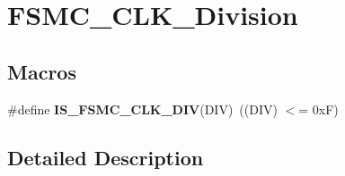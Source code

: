\hypertarget{group___f_s_m_c___c_l_k___division}{\section{F\-S\-M\-C\-\_\-\-C\-L\-K\-\_\-\-Division}
\label{group___f_s_m_c___c_l_k___division}
}
\subsection*{Macros}
\begin{DoxyCompactItemize}
\item 
\hypertarget{group___f_s_m_c___c_l_k___division_ga9e5321b02ea049fd076ba705acd06b5f}{\#define {\bfseries I\-S\-\_\-\-F\-S\-M\-C\-\_\-\-C\-L\-K\-\_\-\-D\-I\-V}(D\-I\-V)~((D\-I\-V) $<$= 0x\-F)}\label{group___f_s_m_c___c_l_k___division_ga9e5321b02ea049fd076ba705acd06b5f}

\end{DoxyCompactItemize}


\subsection{Detailed Description}
